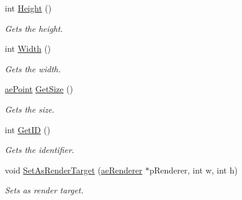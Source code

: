 \begin{DoxyCompactItemize}
int \hyperlink{classae_core_1_1ae_sprite_aaaec389bd44191ed8796fa75373a402b}{Height} ()
\begin{DoxyCompactList}\small\item\em Gets the height. \end{DoxyCompactList}\item 
int \hyperlink{classae_core_1_1ae_sprite_a311d1c6b6dc0fe388f46ca46905f28a6}{Width} ()
\begin{DoxyCompactList}\small\item\em Gets the width. \end{DoxyCompactList}\item 
\hyperlink{structae_core_1_1ae_point}{ae\+Point} \hyperlink{classae_core_1_1ae_sprite_ad46bd4ad56230400d629fa05211d2b10}{Get\+Size} ()
\begin{DoxyCompactList}\small\item\em Gets the size. \end{DoxyCompactList}\item 
int \hyperlink{classae_core_1_1ae_sprite_adcef90ab9c0eb35dbe3386ac81de7e1f}{Get\+ID} ()
\begin{DoxyCompactList}\small\item\em Gets the identifier. \end{DoxyCompactList}\item 
void \hyperlink{classae_core_1_1ae_sprite_ab5aa44b474a501f757ad446a292fa5aa}{Set\+As\+Render\+Target} (\hyperlink{classae_core_1_1ae_renderer}{ae\+Renderer} $\ast$p\+Renderer, int w, int h)
\begin{DoxyCompactList}\small\item\em Sets as render target. \end{DoxyCompactList}\end{DoxyCompactItemize}
